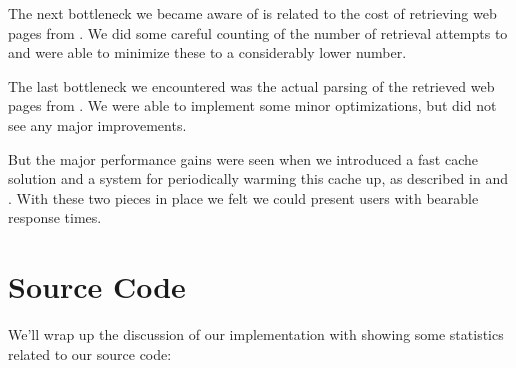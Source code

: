 
The next bottleneck we became aware of is related to the cost of retrieving
web pages from \urort{}. We did some careful counting of the number of
retrieval attempts to \urort{} and were able to minimize these to a
considerably lower number.

The last bottleneck we encountered was the actual parsing of the retrieved web
pages from \urort{}. We were able to implement some minor optimizations, but
did not see any major improvements.

But the major performance gains were seen when we introduced a fast cache
solution and a system for periodically warming this cache up,
as described in
 and
.
With these two pieces in place we felt we could present users with bearable
response times.

\section{Source Code}
\label{section:implementation.source.code}

We'll wrap up the discussion of our implementation with showing some
statistics related to our source code:

